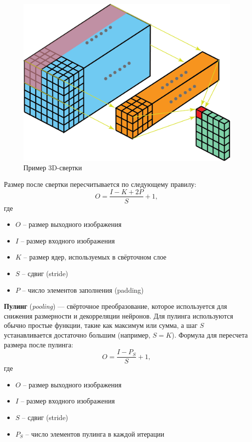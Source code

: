 \begin{figure}[htb]
    \centering
    \includegraphics[scale=0.2]{images/3d-convolution.png}
    \caption{Пример 3D-свертки}
\end{figure}

\begin{remark}
    Размер после свертки пересчитывается по следующему правилу:
    \[
        O=\dfrac{I-K+2P}{S}+1,
    \]
    где
    \begin{itemize}
        \item $O$ -- размер выходного изображения
        \item $I$ -- размер входного изображения
        \item $K$ -- размер ядер, используемых в свёрточном слое
        \item $S$ -- сдвиг (stride)
        \item $P$ -- число элементов заполнения (padding)
    \end{itemize}
\end{remark}

\begin{definition}
    \textbf{Пулинг} (\textit{pooling}) --- свёрточное преобразование, которое используется для снижения размерности и декорреляции нейронов. Для пулинга используются обычно простые функции, такие как максимум или сумма, а шаг $S$ устанавливается достаточно большим (например, $S=K$). Формула для пересчета размера после пулинга:
    \[
        O=\dfrac{I-P_S}{S}+1,
    \]
    где
    \begin{itemize}
        \item $O$ -- размер выходного изображения
        \item $I$ -- размер входного изображения
        \item $S$ -- сдвиг (stride)
        \item $P_S$ -- число элементов пулинга в каждой итерации
    \end{itemize}
\end{definition}

